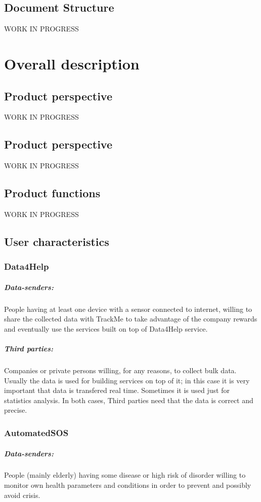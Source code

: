 \documentclass{report}
\begin{document}
		\section{Document Structure}
		WORK IN PROGRESS
	\chapter{Overall description}
		\section{Product perspective}
			WORK IN PROGRESS

		\section{Product perspective}
		WORK IN PROGRESS
		\section{Product functions}
		WORK IN PROGRESS
		\section{User characteristics}
			\subsection{Data4Help}
			\paragraph{Data-senders:}
			People having at least one device with a sensor connected to internet, willing to share the collected data with TrackMe to take advantage of the company rewards and eventually use the services built on top of Data4Help service.
			\paragraph{Third parties:}
			Companies or private persons willing, for any reasons, to collect bulk data. Usually the data is used for building services on top of it; in this case it is very important that data is transfered real time. Sometimes it is used just for statistics analysis. In both cases, Third parties need that the data is correct and precise. 
			\subsection{AutomatedSOS}
			\paragraph{Data-senders:}
			People (mainly elderly) having some disease or high risk of disorder willing to monitor own health parameters and conditions in order to prevent and possibly avoid crisis.
\end{document}

